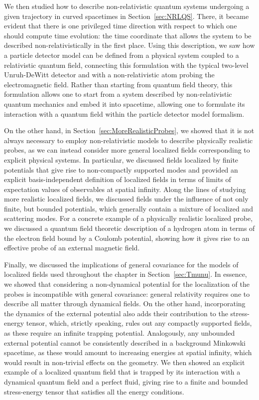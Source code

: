 \documentclass[letterpaper,12pt,titlepage,oneside,final]{book}
\begin{document}
We then studied how to describe non-relativistic quantum systems undergoing a given trajectory in curved spacetimes in Section~\ref{sec:NRLQS}. There, it became evident that there is one privileged time direction with respect to which one should compute time evolution: the time coordinate that allows the system to be described non-relativistically in the first place. Using this description, we saw how a particle detector model can be defined from a physical system coupled to a relativistic quantum field, connecting this formulation with the typical two-level Unruh-DeWitt detector and with a non-relativistic atom probing the electromagnetic field. Rather than starting from quantum field theory, this formulation allows one to start from a system described by non-relativistic quantum mechanics and embed it into spacetime, allowing one to formulate its interaction with a quantum field within the particle detector model formalism. 

On the other hand, in Section~\ref{sec:MoreRealisticProbes}, we showed that it is not always necessary to employ non-relativistic models to describe physically realistic probes, as we can instead consider more general localized fields corresponding to explicit physical systems. In particular, we discussed fields localized by finite potentials that give rise to non-compactly supported modes and provided an explicit basis-independent definition of localized fields in terms of limits of expectation values of observables at spatial infinity. Along the lines of studying more realistic localized fields, we discussed fields under the influence of not only finite, but bounded potentials, which generally contain a mixture of localized and scattering modes. For a concrete example of a physically realistic localized probe, we discussed a quantum field theoretic description of a hydrogen atom in terms of the electron field bound by a Coulomb potential, showing how it gives rise to an effective probe of an external magnetic field.

Finally, we discussed the implications of general covariance for the models of localized fields used throughout the chapter in Section~\ref{sec:Tmunu}. In essence, we showed that considering a non-dynamical potential for the localization of the probes is incompatible with general covariance: general relativity requires one to describe all matter through dynamical fields. On the other hand, incorporating the dynamics of the external potential also adds their contribution to the stress-energy tensor, which, strictly speaking, rules out any compactly supported fields, as these require an infinite trapping potential. Analogously, any unbounded external potential cannot be consistently described in a background Minkowski spacetime, as these would amount to increasing energies at spatial infinity, which would result in non-trivial effects on the geometry. We then showed an explicit example of a localized quantum field that is trapped by its interaction with a dynamical quantum field and a perfect fluid, giving rise to a finite and bounded stress-energy tensor that satisfies all the energy conditions.
\end{document}

